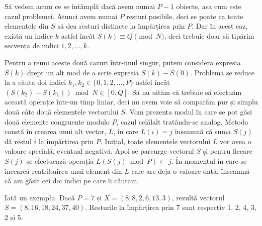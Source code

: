Să vedem acum ce se întâmplă dacă avem numai $P-1$ obiecte, așa cum este cazul
problemei. Atunci avem numai $P$ resturi posibile, deci se poate ca toate
elementele din $S$ să dea resturi distincte la împărțirea prin $P$. Dar în
acest caz, există un indice $k$ astfel încât $S(k) \equiv Q \pmod{N}$, deci
trebuie doar să tipărim secvența de indici $1, 2, \dots, k$.

Pentru a reuni aceste două cazuri într-unul singur, putem considera expresia
$S(k)$ drept un alt mod de a scrie expresia $S(k) - S(0)$. Problema se reduce
la a căuta doi indici $k_1, k_2 \in \{0, 1, 2, \dots, P\}$ astfel încât
$(S(k_2) - S(k_1)) \bmod N \in [0,Q]$. Să nu uităm că trebuie să efectuăm
această operație într-un timp liniar, deci nu avem voie să comparăm pur și
simplu două câte două elementele vectorului $S$. Vom prezenta modul în care se
pot găsi două elemente congruente modulo $P$, cazul celălalt tratându-se
analog. Metoda constă în crearea unui alt vector, $L$, în care $L(i) = j$
înseamnă că suma $S(j)$ dă restul $i$ la împărțirea prin $P$. Inițial, toate
elementele vectorului $L$ vor avea o valoare specială, eventual negativă. Apoi
se parcurge vectorul $S$ și pentru fiecare $S(j)$ se efectuează operația
$L(S(j) \bmod P) \leftarrow j$. În momentul în care se încearcă reatribuirea
unui element din $L$ care are deja o valoare dată, înseamnă că am găsit cei
doi indici pe care îi căutam.

Iată un exemplu. Dacă $P=7$ și $X=(8, 8, 2, 6, 13, 3)$, rezultă vectorul
$S=(8, 16, 18, 24, 37, 40)$. Resturile la împărțirea prin 7 sunt respectiv 1,
2, 4, 3, 2 și 5.


